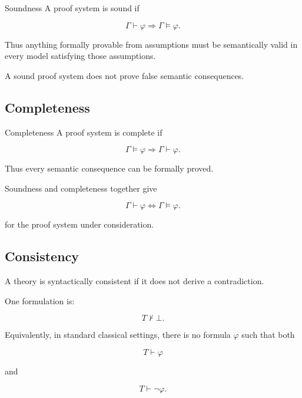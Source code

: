 \begin{definitionbox}{Soundness}
A proof system is sound if

\[
\boxed{
\Gamma\vdash\varphi
\Longrightarrow
\Gamma\models\varphi.
}
\]
\end{definitionbox}

Thus anything formally provable from assumptions must be semantically
valid in every model satisfying those assumptions.

A sound proof system does not prove false semantic consequences.

\subsection{Completeness}
\label{subsec:formal-completeness}

\begin{definitionbox}{Completeness}
A proof system is complete if

\[
\boxed{
\Gamma\models\varphi
\Longrightarrow
\Gamma\vdash\varphi.
}
\]
\end{definitionbox}

Thus every semantic consequence can be formally proved.

Soundness and completeness together give

\[
\boxed{
\Gamma\vdash\varphi
\iff
\Gamma\models\varphi.
}
\]

for the proof system under consideration.

\subsection{Consistency}
\label{subsec:formal-consistency}

A theory is syntactically consistent if it does not derive a contradiction.

One formulation is:

\[
\boxed{
T\nvdash\bot.
}
\]

Equivalently, in standard classical settings, there is no formula
\(\varphi\) such that both

\[
T\vdash\varphi
\]

and

\[
T\vdash\neg\varphi.
\]


